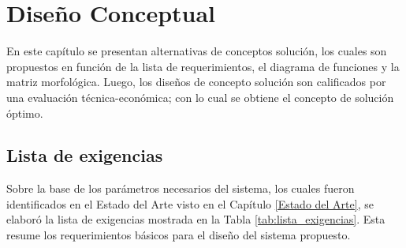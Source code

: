 

\chapter{Diseño Conceptual}

En este capítulo se presentan alternativas de conceptos solución, los cuales son propuestos en función de la lista de requerimientos, el diagrama de funciones y la matriz morfológica. Luego, los diseños de concepto solución son calificados por una evaluación técnica-económica; con lo cual se obtiene el concepto de solución óptimo.

\section{Lista de exigencias}

Sobre la base de los parámetros necesarios del sistema, los cuales fueron identificados en el Estado del Arte visto en el Capítulo \ref{Estado del Arte}, se elaboró la lista de exigencias mostrada en la Tabla \ref{tab:lista_exigencias}. Esta resume los requerimientos básicos para el diseño del sistema propuesto.


